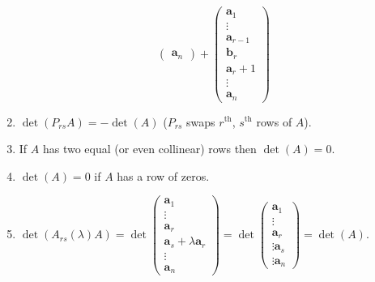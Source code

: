 \documentclass[10pt, a4paper]{article}
\newcommand{\mbf}[1]{\mathbf{#1}}
\begin{document}
\begin{enumerate}[label = (\roman*)]
\[\begin{pmatrix}
    \mbf{a}_n
    \end{pmatrix}
    +\begin{pmatrix}
        \mbf{a}_1 \\
        \vdots \\
        \mbf{a}_{r - 1} \\
        \mbf{b}_r \\
        \mbf{a}_r + 1 \\
        \vdots \\
        \mbf{a}_n
    \end{pmatrix}
    \]
    \item $\det(P_{rs}A) = -\det(A)$
    ($P_{rs}$ swaps $r ^ {\text{th}}$, $s ^ {\text{th}}$ rows of $A$).
    \item If $A$ has two equal (or even collinear) rows then $\det(A) = 0$.
    \item $\det(A) = 0$ if $A$ has a row of zeros.
    \item $\det(A_{rs}(\lambda)A) = \det\begin{pmatrix}
        \mbf{a}_1 \\ \vdots \\ \mbf{a}_r \\ \mbf{a}_s + \lambda \mbf{a}_r \\ \vdots \\ \mbf{a}_n\end{pmatrix} = \det\begin{pmatrix}
            \mbf{a}_1 \\ \vdots \\ \mbf{a}_r \\ \vdots \mbf{a}_s \\ \vdots \mbf{a}_n
        \end{pmatrix} = \det(A).$
\end{enumerate}
\end{document}
